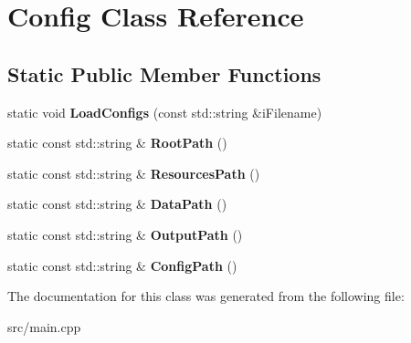 \hypertarget{classConfig}{\section{Config Class Reference}
\label{classConfig}
}
\subsection*{Static Public Member Functions}
\begin{DoxyCompactItemize}
\item 
\hypertarget{classConfig_a568c93f4eed136d38e6feee300a28b5d}{static void {\bfseries Load\-Configs} (const std\-::string \&i\-Filename)}\label{classConfig_a568c93f4eed136d38e6feee300a28b5d}

\item 
\hypertarget{classConfig_a3cefb1704bfbd41aa205265f218da0a0}{static const std\-::string \& {\bfseries Root\-Path} ()}\label{classConfig_a3cefb1704bfbd41aa205265f218da0a0}

\item 
\hypertarget{classConfig_a607783622e38763472830639f04a17fd}{static const std\-::string \& {\bfseries Resources\-Path} ()}\label{classConfig_a607783622e38763472830639f04a17fd}

\item 
\hypertarget{classConfig_ac3a7c38f6d1196a75b7d42d870131cec}{static const std\-::string \& {\bfseries Data\-Path} ()}\label{classConfig_ac3a7c38f6d1196a75b7d42d870131cec}

\item 
\hypertarget{classConfig_ae85d5337c5a2612a3890629ee5443e2e}{static const std\-::string \& {\bfseries Output\-Path} ()}\label{classConfig_ae85d5337c5a2612a3890629ee5443e2e}

\item 
\hypertarget{classConfig_af873ea8c47d328921d9a20b884700e76}{static const std\-::string \& {\bfseries Config\-Path} ()}\label{classConfig_af873ea8c47d328921d9a20b884700e76}

\end{DoxyCompactItemize}


The documentation for this class was generated from the following file\-:\begin{DoxyCompactItemize}
\item 
src/main.\-cpp\end{DoxyCompactItemize}
